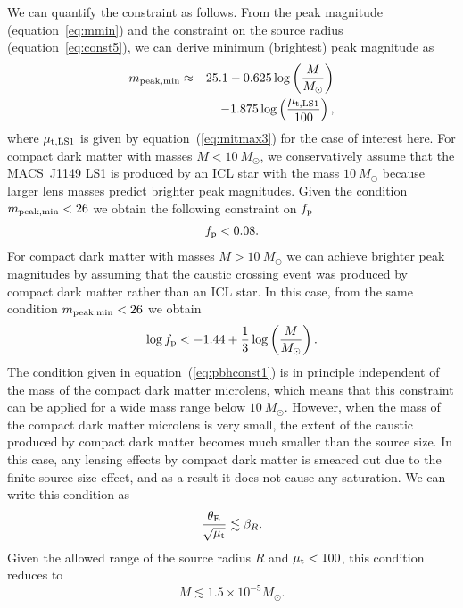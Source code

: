 \documentclass[showpacs,twocolumn,preprintnumbers,amsmath,amssymb,superscriptaddress,nofootinbib]{revtex4}
\begin{document}
We can quantify the constraint as follows. From the peak magnitude
(equation~\ref{eq:mmin}) and the constraint on the source radius
(equation~\ref{eq:const5}), we can derive minimum (brightest) peak
magnitude as 
\begin{eqnarray}
m_{\rm peak,min}&\approx&
25.1-0.625\log\left(\frac{M}{M_\odot}\right)\nonumber\\
&&-1.875\log\left(\frac{\mu_{\rm t, LS1}}{100}\right),
\end{eqnarray}
where $\mu_{\rm t, LS1}$ is given by equation~(\ref{eq:mitmax3}) for
the case of interest here. For compact dark matter with masses
$M<10~M_\odot$, we conservatively assume that the MACS~J1149 LS1 is
produced by an ICL star with the mass $10~M_\odot$ because larger
lens masses predict brighter peak magnitudes. Given the
condition $m_{\rm  peak,min}<26$ we obtain the following constraint on
$f_{\rm p}$ 
\begin{eqnarray}
f_{\rm p}<0.08.
\label{eq:pbhconst1}
\end{eqnarray}
For compact dark matter with masses $M>10~M_\odot$ we can achieve
brighter peak magnitudes by assuming that the caustic crossing event
was produced by compact dark matter rather than an ICL star. In this
case, from the same condition $m_{\rm peak,min}<26$ we obtain
\begin{eqnarray}
\log f_{\rm p}<-1.44+\frac{1}{3}\log\left(\frac{M}{M_\odot}\right).
\end{eqnarray}
The condition given in equation~(\ref{eq:pbhconst1}) is in principle
independent of the mass of the compact dark matter microlens, which
means that this constraint can be applied for a wide mass range below
$10~M_\odot$. However, when the mass of the compact dark matter
microlens is very small, the extent of the caustic produced by compact
dark matter becomes much smaller than the source size. In this case,
any lensing effects by compact dark matter is smeared out due to the
finite source size effect, and as a result it does not cause any
saturation. We can write this condition as 
\begin{equation}
\frac{\theta_{\rm E}}{\sqrt{\mu_{\rm t}}}\lesssim \beta_R.
\end{equation}
Given the allowed range of the source radius $R$ and $\mu_{\rm
  t}<100$, this condition reduces to 
\begin{equation}
M\lesssim 1.5\times 10^{-5}M_\odot.
\end{equation}
\end{document}
